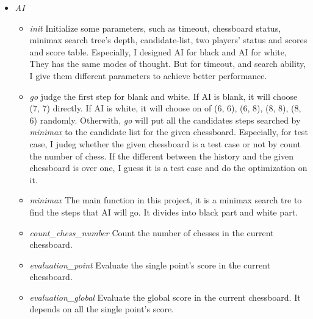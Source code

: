 \documentclass[10pt,twocolumn,letterpaper]{article}
\begin{document}
\begin{itemize}
    \item
    \emph{AI}
    \begin{itemize}
        \item
        \emph{init} 
        Initialize some parameters, such as timeout, chessboard status, minimax search tree's depth, candidate-list, two players' status and scores and score table. Especially, I designed AI for black and AI for white, They has the same modes of thought. But for timeout, and search ability, I give them different parameters to achieve better performance.
    \end{itemize}
    \begin{itemize}
        \item 
        \emph{go}
        judge the first step for blank and white. If AI is blank, it will choose (7, 7) directly. If AI is white, it will choose on of (6, 6), (6, 8), (8, 8), (8, 6) randomly. Otherwith, \emph{go} will put all the candidates steps searched by \emph{minimax} to the candidate list for the given chessboard. Especially, for test case, I judeg whether the given chessboard is a test case or not by count the number of chess. If the different between the history and the given chessboard is over one, I guess it is a test case and do the optimization on it.
    \end{itemize}
    \begin{itemize}
        \item 
        \emph{minimax}
        The main function in this project, it is a minimax search tre to find the steps that AI will go. It divides into black part and white part.
    \end{itemize}
    \begin{itemize}
        \item 
        \emph{count\_chess\_number}
        Count the number of chesses in the current chessboard.
    \end{itemize}
    \begin{itemize}
        \item 
        \emph{evaluation\_point}
        Evaluate the single point's score in the current chessboard.
    \end{itemize}
    \begin{itemize}
        \item 
        \emph{evaluation\_global}
        Evaluate the global score in the current chessboard. It depends on all the single point's score.
    \end{itemize}

\end{itemize}
\end{document}
